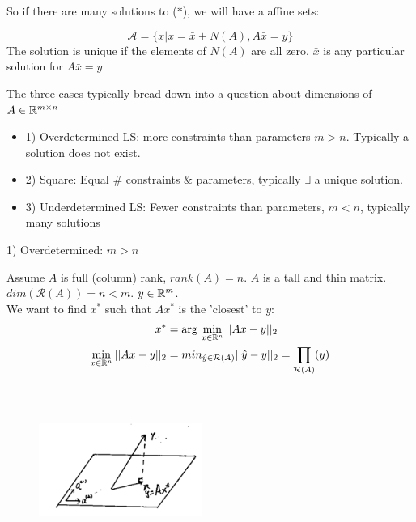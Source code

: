 So if there are many solutions to ($*$), we will have a affine sets:

\begin{equation*}
\mathcal{A} = \{x|x = \bar{x} + N(A), A\bar{x} = y \}
\end{equation*}
The solution is unique if the elements of $N(A)$ are all zero. $\bar{x}$ is any particular solution for $A\bar{x} =y$

\vspace{0.5cm}
The three cases typically bread down into a question about dimensions of $A\in \mathbb{R}^{m\times n}$
\begin{itemize}
	\item 1) Overdetermined LS: more constraints than parameters $m>n$. Typically a solution does not exist. 
	
	\item 2) Square: Equal \# constraints \& parameters, typically $\exists$ a unique solution.
	
	\item 3) Underdetermined LS: Fewer constraints than parameters, $m<n$, typically many solutions
\end{itemize}

1) Overdetermined: $m > n$

Assume $A$ is full (column) rank, $rank(A) =n$. $A$ is a tall and thin matrix. $dim(\mathcal{R}(A)) = n < m$. $y\in \mathbb{R}^m$.\\

We want to find $x^*$ such that $Ax^*$ is the 'closest' to $y$:
\begin{align*}
x^* &= \arg \, \min_{x\in \mathbb{R}^n}||Ax - y||_2\\
\min_{x\in \mathbb{R}^{n}}||Ax - y||_2 &= min_{\hat{y}\in \mathcal{R}(A)}||\hat{y} - y||_2 =\prod_{\mathcal{R}(A)}(y)\\
\end{align*}

\begin{figure}
	\centering
	\includegraphics[width=2.1in,height=2.1in]{figures/ch06/figure1.png}
\end{figure}

